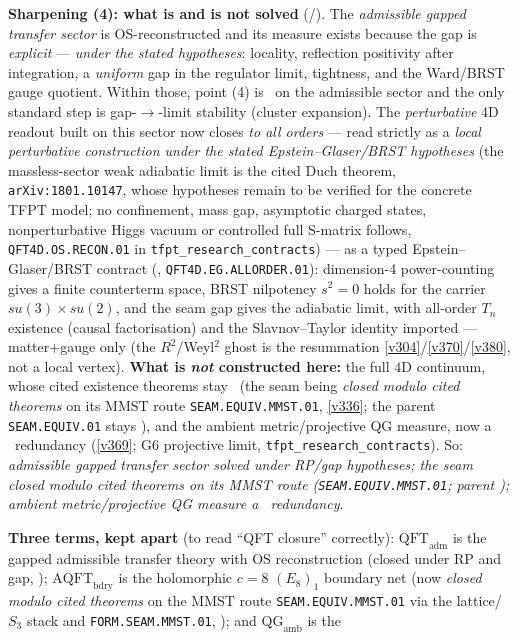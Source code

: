 \par\smallskip\noindent\textbf{Sharpening (4): what is and is not solved} (\mE/\mC).
The \emph{admissible gapped transfer sector} is OS-reconstructed and its measure exists because the gap is
\emph{explicit} --- \emph{under the stated hypotheses}: locality, reflection positivity after integration, a
\emph{uniform} gap in the regulator limit, tightness, and the Ward/BRST gauge quotient. Within those, point
(4) is \mE\ on the admissible sector and the only standard step is gap-$\to$-limit stability (cluster
expansion). The \emph{perturbative} 4D readout built on this sector now closes \emph{to all orders} --- read strictly as a
\emph{local perturbative construction under the stated Epstein--Glaser/BRST hypotheses} (the massless-sector weak
adiabatic limit is the cited Duch theorem, \texttt{arXiv:1801.10147}, whose hypotheses remain to be verified for the
concrete TFPT model; no confinement, mass gap, asymptotic charged states, nonperturbative Higgs vacuum or controlled
full S-matrix follows, \texttt{QFT4D.OS.RECON.01} in \texttt{tfpt\_research\_contracts}) --- as a typed
Epstein--Glaser/BRST contract (, \texttt{QFT4D.EG.ALLORDER.01}): dimension-4
power-counting gives a finite counterterm space, BRST nilpotency $s^2{=}0$ holds for the carrier $su(3){\times}su(2)$,
and the seam gap gives the adiabatic limit, with all-order $T_n$ existence (causal factorisation) and the
Slavnov--Taylor identity imported --- matter$+$gauge only (the $R^2$/Weyl$^2$ ghost is the resummation
\vref{v304}/\vref{v370}/\vref{v380}, not a local vertex). \textbf{What is \emph{not} constructed here:} the full $4$D continuum, whose cited existence theorems
stay \mO\ (the seam being \emph{closed modulo cited theorems} on its MMST route \texttt{SEAM.EQUIV.MMST.01}, \vref{v336}; the parent \texttt{SEAM.EQUIV.01} stays \mO), and the ambient metric/projective QG
measure, now a \mC\ redundancy (\vref{v369}; G6 projective limit, \texttt{tfpt\_research\_contracts}).
So: \emph{admissible gapped transfer sector solved under RP/gap hypotheses; the seam closed modulo cited theorems on
its MMST route (\texttt{SEAM.EQUIV.MMST.01}; parent \mO);
ambient metric/projective QG measure a \mC\ redundancy}.
\par\smallskip\noindent\textbf{Three terms, kept apart} (to read ``QFT closure'' correctly): $\mathrm{QFT}_{\mathrm{adm}}$
is the gapped admissible transfer theory with OS reconstruction (closed under RP and gap, \mE);
$\mathrm{AQFT}_{\mathrm{bdry}}$ is the holomorphic $c=8$ $(E_8)_1$ boundary net (now \emph{closed modulo cited
theorems} on the MMST route \texttt{SEAM.EQUIV.MMST.01} via the lattice/$S_3$ stack and \texttt{FORM.SEAM.MMST.01}, \mC); and $\mathrm{QG}_{\mathrm{amb}}$ is the
